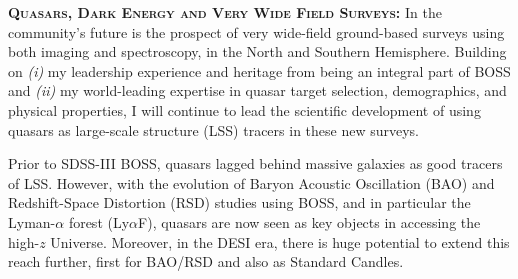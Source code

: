 \smallskip
\smallskip
\noindent
\textbf{\textsc{Quasars, Dark Energy and Very Wide Field Surveys: }}
In the community's future is the prospect of very wide-field
ground-based surveys using both imaging and spectroscopy, in the North
and Southern Hemisphere. Building on {\it (i)} my leadership
experience and heritage from being an integral part of BOSS and {\it
(ii)} my world-leading expertise in quasar target selection,
demographics, and physical properties, I will continue to lead the
scientific development of using quasars as large-scale structure (LSS)
tracers in these new surveys.

\smallskip \smallskip
\noindent 
Prior to SDSS-III BOSS, quasars lagged behind massive galaxies as good
tracers of LSS. However, with the evolution of Baryon Acoustic
Oscillation (BAO) and Redshift-Space Distortion (RSD) studies using
BOSS, and in particular the Lyman-$\alpha$ forest (Ly$\alpha$F),
quasars are now seen as key objects in accessing the high-$z$
Universe. Moreover, in the DESI era, there is huge potential to extend
this reach further, first for BAO/RSD and also as Standard Candles. 


